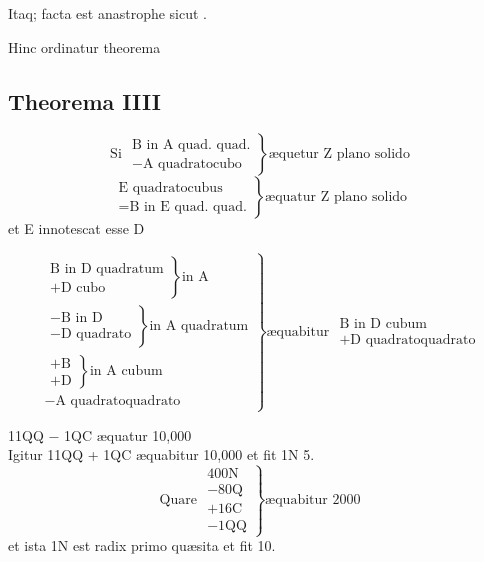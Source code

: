 \documentclass[11pt,a4paper]{article}
\begin{document}
Itaq; facta est anastrophe sicut .

Hinc ordinatur theorema

\subsection*{Theorema IIII}

\[ \text{Si } \left.\begin{array}{l} \text{B in A quad. quad.} \\ -\text{A quadratocubo} \end{array}\right\} \text{æquetur Z plano solido} \]
\[ \left.\begin{array}{l} \text{E quadratocubus} \\ =\text{B in E quad. quad.} \end{array}\right\} \text{æquatur Z plano solido} \]
\marginal{+}
et E innotescat esse D

\[ \left.\begin{array}{l} \left.\begin{array}{l} \text{B in D quadratum} \\ +\text{D cubo} \end{array}\right\} \text{in A} \\ \left.\begin{array}{l} -\text{B in D} \\ -\text{D quadrato} \end{array}\right\} \text{in A quadratum} \\ \left.\begin{array}{l} +\text{B} \\ +\text{D} \end{array}\right\} \text{in A cubum} \\ -\text{A quadratoquadrato} \end{array}\right\} \text{æquabitur } \begin{array}{l} \text{B in D cubum} \\ +\text{D quadratoquadrato} \end{array} \]

11QQ $-$ 1QC æquatur 10,000\\
Igitur 11QQ + 1QC æquabitur 10,000 et fit 1N 5.
\[ \text{Quare } \left.\begin{array}{l} \text{400N} \\ -\text{80Q} \\ +\text{16C} \\ -\text{1QQ} \end{array}\right\} \text{æquabitur 2000} \]
et ista 1N est radix primo quæsita et fit 10.
\end{document}
